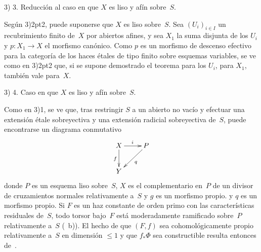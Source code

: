 \shorthandoff{<>}%

3) 3. Reducción al caso en que $X$ es liso y afín sobre~$S$.

Según 3)\kern2pt2, puede suponerse que $X$ es liso sobre~$S$. Sea
$(U_i)_{i\in I}$ un recubrimiento finito de~$X$ por abiertos afines, y
sea $X_1$ la suma disjunta de los $U_i$ y
$p\colon X_1 \to X$ el morfismo canónico. Como $p$ es un morfismo de
descenso efectivo para la categoría de los haces étales de tipo finito
sobre esquemas variables, se ve como en 3)\kern2pt2 que, si se supone
demostrado el teorema para los $U_i$, \ie para $X_1$, también vale
para~$X$.

3) 4. Caso en que $X$ es liso y afín sobre~$S$.

Como en 3)1, se ve que, tras restringir $S$ a un abierto no vacío y
efectuar una extensión étale sobreyectiva y una extensión radicial
sobreyectiva de~$S$, puede encontrarse un diagrama conmutativo
$$
\xymatrix{ X \ar[r]^{i} \ar[d]_{f} & P \ar[ld]^{q} \\ Y }
$$
donde $P$ es un esquema liso sobre~$S$, $X$ es el complementario en~$P$
de un divisor de cruzamientos normales relativamente a~$S$
{y $g$ es un morfismo propio.}
{y $q$ es un morfismo propio.}
Si $F$ es un haz constante de orden primo con las características
residuales de~$S$, todo torsor bajo~$F$ está moderadamente ramificado
sobre~$P$ relativamente a~$S$ (~b)). El hecho de que
$(F,f)$ sea cohomológicamente propio relativamente a~$S$ en dimensión
$\leqslant 1$ y que $f_*\Phi$ sea constructible resulta entonces
de~.
